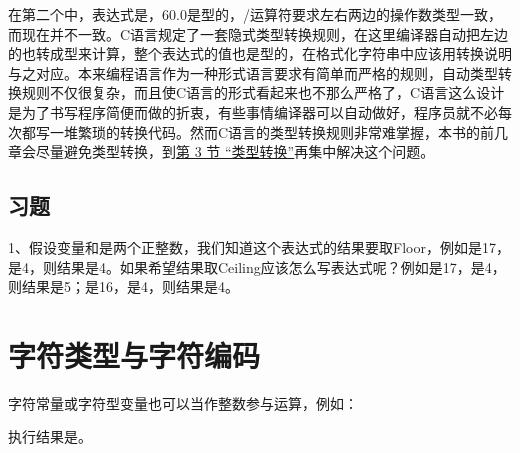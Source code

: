 

在第二个中，表达式是，60.\BookSplit{}0是型的，/运算符要求左右两边的操作数类型一致，而现在并不一致。C语言规定了一套隐式类型转换规则，在这里编译器自动把左边的也转成型来计算，整个表达式的值也是型的，在格式化字符串中应该用转换说明与之对应。本来编程语言作为一种形式语言要求有简单而严格的规则，自动类型转换规则不仅很复杂，而且使C语言的形式看起来也不那么严格了，C语言这么设计是为了书写程序简便而做的折衷，有些事情编译器可以自动做好，程序员就不必每次都写一堆繁琐的转换代码。然而C语言的类型转换规则非常难掌握，本书的前几章会尽量避免类型转换，到\hyperlink{db.ch15s03.id2757924}{第 3 节 “类型转换”}再集中解决这个问题。


\subsection*{习题}
%


1、假设变量和是两个正整数，我们知道这个表达式的结果要取Floor，例如是17，是4，则结果是4。如果希望结果取Ceiling应该怎么写表达式呢？例如是17，是4，则结果是5；是16，是4，则结果是4。




\section{字符类型与字符编码}
%
字符常量或字符型变量也可以当作整数参与运算，例如：




执行结果是。



